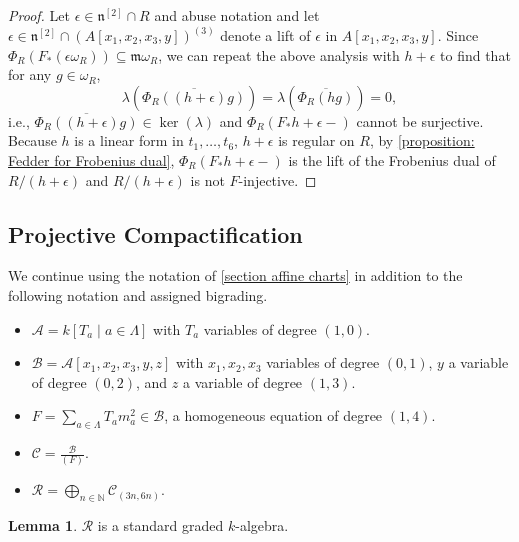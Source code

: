 \documentclass[reqno,11pt]{amsart}
\numberwithin{equation}{section}
\theoremstyle{definition}
\theoremstyle{definition}
\newtheorem{lemma}[theorem]{Lemma}
\theoremstyle{definition}
\theoremstyle{remark}
\renewcommand{\ker}{\operatorname{ker}}
\newcommand{\NN}{\mathbb{N}}
\newcommand{\fm}{\mathfrak{m}}
\newcommand{\fn}{\mathfrak{n}}
\begin{document}
\begin{proof}
    Let $\epsilon\in \fn^{[2]}\cap R$ and abuse notation and let $\epsilon\in \fn^{[2]}\cap (A[x_1,x_2,x_3,y])^{(3)}$ denote a lift of $\epsilon$ in $A[x_1,x_2,x_3,y]$. Since $\Phi_R(F_*(\epsilon\omega_R))\subseteq \fm \omega_R$, we can repeat the above analysis with $h+\epsilon$ to find that for any $g\in \omega_R$,
    \[
    \lambda(\overline{\Phi_R((h+\epsilon)g)})= \lambda(\overline{\Phi_R(hg)}) = 0,
    \]
    i.e., $\overline{\Phi_R((h+\epsilon)g)}\in \ker(\lambda)$ and $\Phi_R(F_*h+\epsilon-)$ cannot be surjective. Because $h$ is a linear form in $t_1,\ldots,t_6$, $h + \epsilon$ is regular on $R$, by \cref{proposition: Fedder for Frobenius dual}, $\Phi_R(F_*h+\epsilon-)$ is the lift of the Frobenius dual of $R/(h+\epsilon)$ and $R/(h+\epsilon)$ is not $F$-injective.
\end{proof}



\subsection{Projective Compactification}\label{section Projective model}


We continue using the notation of \cref{section affine charts} in addition to the following notation and assigned bigrading.
\begin{itemize}
    \item $\displaystyle \mathcal{A}=k[T_a\mid a\in\Lambda]$ with $T_a$ variables of degree $(1,0)$.
    \item $\displaystyle \mathcal{B} = \mathcal{A}[x_1,x_2,x_3,y,z]$ with $x_1,x_2,x_3$ variables of degree $(0,1)$, $y$ a variable of degree $(0,2)$, and $z$ a variable of degree $(1,3)$.
    \item $F = \sum_{a\in\Lambda}T_a m_a^2\in \mathcal{B}$, a homogeneous equation of degree $(1,4)$.
    \item $\displaystyle \mathcal{C} = \frac{\mathcal{B}}{(F)}$.
    \item $\displaystyle \mathcal{R} = \bigoplus_{n\in\NN} \mathcal{C}_{(3n,6n)}$.
\end{itemize}


\begin{lemma}
    \label{lem: script R standard graded F-rational}
    $\mathcal{R}$ is a standard graded $k$-algebra.
\end{lemma}
\end{document}
